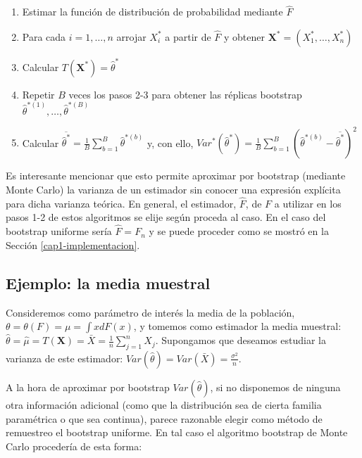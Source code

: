 \documentclass[
]{book}
\theoremstyle{definition}
\theoremstyle{definition}
\theoremstyle{definition}
\theoremstyle{remark}
\begin{document}
\begin{enumerate}
\def\labelenumi{\arabic{enumi}.}
\item
  Estimar la función de distribución de probabilidad mediante \(\hat{ F}\)
\item
  Para cada \(i=1,\ldots ,n\) arrojar \(X_i^{\ast}\) a partir de
  \(\hat{F}\) y obtener
  \(\mathbf{X}^{\ast}=\left( X_1^{\ast}, \ldots, X_n^{\ast} \right)\)
\item
  Calcular
  \(T\left( \mathbf{X}^{\ast} \right) = \hat{\theta}^{\ast}\)
\item
  Repetir \(B\) veces los pasos 2-3 para obtener las réplicas bootstrap
  \(\hat{\theta}^{\ast (1)}, \ldots, \hat{\theta}^{\ast(B)}\)
\item
  Calcular
  \(\overline{\hat{\theta}^{\ast}}=\frac{1}{B}\sum_{b=1}^{B}\hat{ \theta}^{\ast (b)}\) y, con ello,
  \(Var^{\ast}\left( \hat{\theta}^{\ast} \right) =\frac{1}{B}\sum_{b=1}^{B}\left( \hat{\theta}^{\ast \left(b \right)}-\overline{\hat{\theta}^{\ast}} \right)^2\)
\end{enumerate}

Es interesante mencionar que esto permite aproximar por bootstrap
(mediante Monte Carlo) la varianza de un estimador sin conocer una
expresión explícita para dicha varianza teórica.
En general, el estimador, \(\hat{F}\), de \(F\) a utilizar en los pasos 1-2
de estos algoritmos se elije según proceda al caso. En el caso del
bootstrap uniforme sería \(\hat{F}=F_n\) y se puede proceder
como se mostró en la Sección \ref{cap1-implementacion}.

\hypertarget{ejemplo-la-media-muestral}{%
\subsection{Ejemplo: la media muestral}\label{ejemplo-la-media-muestral}}

Consideremos como parámetro de interés la media de la población,
\(\theta =\theta \left( F \right) =\mu =\int xdF\left( x \right)\), y
tomemos como estimador la media muestral:
\(\hat{\theta}=\hat{\mu}=T\left( \mathbf{X} \right) =\bar{X}=\frac{1}{n}\sum_{j=1}^{n}X_j\).
Supongamos que deseamos estudiar la varianza de este estimador:
\(Var\left( \hat{\theta} \right) =Var\left( \bar{X} \right) =\frac{\sigma^2}{n}\).

A la hora de aproximar por bootstrap \(Var\left( \hat{\theta} \right)\),
si no disponemos de ninguna otra información adicional (como que la
distribución sea de cierta familia paramétrica o que sea continua),
parece razonable elegir como método de remuestreo el bootstrap uniforme.
En tal caso el algoritmo bootstrap de Monte Carlo procedería de esta
forma:
\end{document}

